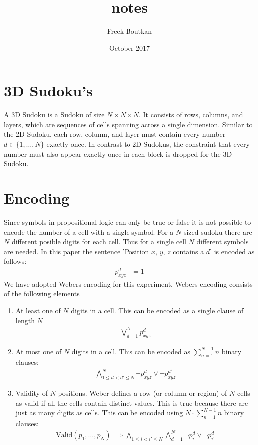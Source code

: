 \documentclass{article}
\title{notes}
\author{Freek Boutkan}
\date{October 2017}
\begin{document}
\begin{abstract}

\end{abstract}

\section{3D Sudoku's}

A 3D Sudoku is a Sudoku of size $N \times N \times N$. It consists of rows, columns, and layers, which are sequences of cells spanning across a single dimension. Similar to the 2D Sudoku, each row, column, and layer must contain every number $d \in \{1, \hdots, N\}$ exactly once. In contrast to 2D Sudokus, the constraint that every number must also appear exactly once in each block is dropped for the 3D Sudoku. 



\section{Encoding}
Since symbols in propositional logic can only be true or false it is not possible to encode the number of a cell with a single symbol. For a $N$ sized sudoku there are $N$ different posible digits for each cell. Thus for a single cell $N$ different symbols are needed. In this paper the sentence 'Position $x$, $y$, $z$ contains a $d$' is encoded as follows:
\begin{align}
  p_{xyz}^d &= 1
\end{align}
We have adopted Webers \cite{weber2005sat} encoding for this experiment. Webers encoding consists of the following elements
\begin{enumerate}
  \item At least one of $N$ digits in a cell. This can be encoded as a single clause of length $N$
    \begin{align}
      \bigvee_{d=1}^N p_{xyz}^d
    \end{align}
  \item At most one of $N$ digits in a cell. This can be encoded as $\sum_{n=1}^{N-1}n$ binary clauses:
    \begin{align}
      \bigwedge_{1 \leq d < d' \leq N}^N \neg p_{xyz}^d \vee \neg p_{xyz}^{d'}
    \end{align}
  \item Validity of $N$ positions. Weber defines a row (or column or region) of $N$ cells as valid if all the cells contain distinct values. This is true because there are just as many digits as cells. This can be encoded using $N \cdot \sum_{n=1}^{N-1}n$ binary clauses:
    \begin{align}
      \text{Valid}(p_1,\dots,p_N) \implies \bigwedge_{1 \leq i < i' \leq N}\bigwedge_{d=1}^N \neg p_{i}^d \vee \neg p_{i'}^{d}
    \end{align}
\end{enumerate}
\end{document}
